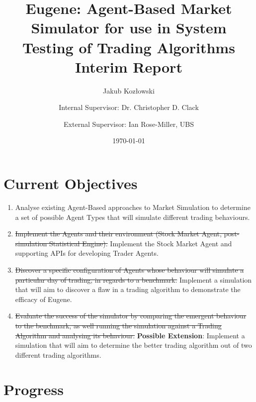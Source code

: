 \documentclass[10pt,a4paper]{article}
\title{Eugene: Agent-Based Market Simulator for use in System Testing of Trading Algorithms \\ Interim Report}
\author{Jakub Koz\l owski \and Internal Supervisor: Dr. Christopher D. Clack \and External Supervisor: Ian Rose-Miller, UBS}
\date{\today}
\begin{document}
\maketitle

\section*{Current Objectives}
\begin{enumerate}
\item Analyse existing Agent-Based approaches to Market Simulation to determine a set of possible Agent Types that will simulate different trading behaviours.

\item \sout{Implement the Agents and their environment (Stock Market Agent, post-simulation Statistical Engine).} Implement the Stock Market Agent and supporting APIs for developing Trader Agents.

\item \sout{Discover a specific configuration of Agents whose behaviour will simulate a particular day of trading, in regards to a benchmark.} Implement a simulation that will aim to discover a flaw in a trading algorithm to demonstrate the efficacy of Eugene. 

\item \sout{Evaluate the success of the simulator by comparing the emergent behaviour to the benchmark, as well running the simulation against a Trading Algorithm and analysing its behaviour.} \textbf{Possible Extension}: Implement a simulation that will aim to determine the better trading algorithm out of two different trading algorithms.
\end{enumerate}

\section*{Progress}
\end{document}
